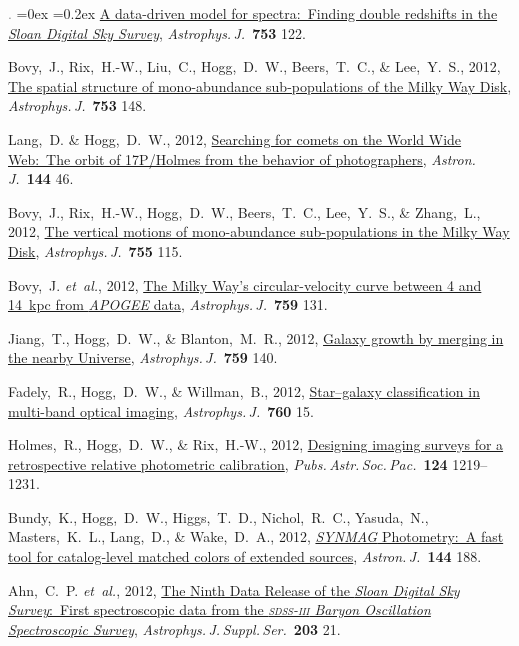 \documentclass[12pt,letterpaper]{article}
\newcommand{\latin}[1]{\textsl{#1}}
\newcommand{\etal}{\latin{et~al.}}
\newcommand{\project}[1]{\textsl{#1}}
\newcommand{\doi}[2]{\href{http://dx.doi.org/#1}{{#2}}}
\newcommand{\deemph}[1]{\textcolor{grey}{\footnotesize{#1}}}
\newcommand{\pubnumber}[1]{\deemph{{#1}.}}
\newcounter{refpubnum}
\newcommand{\hogglist}{%
    \rightmargin=0in
    \leftmargin=0.18in
    \topsep=0ex
    \partopsep=0pt
    \itemsep=0.2ex
    \parsep=0pt
    \itemindent=-1.0\leftmargin
    \listparindent=0.0\leftmargin
    \settowidth{\labelsep}{~}
    \usecounter{refpubnum}
  }
\begin{document}
\begin{list}{\pubnumber{\therefpubnum}}{\hogglist}
\doi{10.1088/0004-637X/753/2/122}{A data-driven model for spectra:\ Finding double redshifts in the \project{Sloan Digital Sky Survey}},
\textit{Astrophys.\,J.}\ \textbf{753} 122.
\item
Bovy,~J., Rix,~H.-W., Liu,~C., Hogg,~D.~W., Beers,~T.~C., \& Lee,~Y.~S., 2012,
\doi{10.1088/0004-637X/753/2/148}{The spatial structure of mono-abundance sub-populations of the Milky Way Disk},
\textit{Astrophys.\,J.}\ \textbf{753} 148.
\item
Lang,~D. \& Hogg,~D.~W., 2012,
\doi{10.1088/0004-6256/144/2/46}{Searching for comets on the World Wide Web:\ The orbit of 17P/Holmes from the behavior of photographers},
\textit{Astron.\,J.}\ \textbf{144} 46.
\item
Bovy,~J., Rix,~H.-W., Hogg,~D.~W., Beers,~T.~C., Lee,~Y.~S., \& Zhang,~L., 2012,
\doi{10.1088/0004-637X/755/2/115}{The vertical motions of mono-abundance sub-populations in the Milky Way Disk},
\textit{Astrophys.\,J.}\ \textbf{755} 115.
\item
Bovy,~J. \etal, 2012,
\doi{10.1088/0004-637X/759/2/131}{The Milky Way's circular-velocity curve between 4 and 14~kpc from \project{APOGEE} data},
\textit{Astrophys.\,J.}\ \textbf{759} 131.
\item
Jiang,~T., Hogg,~D.~W., \& Blanton,~M.~R., 2012,
\doi{10.1088/0004-637X/759/2/140}{Galaxy growth by merging in the nearby Universe},
\textit{Astrophys.\,J.}\ \textbf{759} 140.
\item
Fadely,~R., Hogg,~D.~W., \& Willman,~B., 2012,
\doi{10.1088/0004-637X/760/1/15}{Star--galaxy classification in multi-band optical imaging},
\textit{Astrophys.\,J.}\ \textbf{760} 15.
\item
Holmes,~R., Hogg,~D.~W., \& Rix,~H.-W., 2012,
\doi{10.1086/668656}{Designing imaging surveys for a retrospective relative photometric calibration},
\textit{Pubs.\,Astr.\,Soc.\,Pac.}\ \textbf{124} 1219--1231.
\item
Bundy,~K., Hogg,~D.~W., Higgs,~T.~D., Nichol,~R.~C., Yasuda,~N., Masters,~K.~L., Lang,~D.,
\& Wake,~D.~A., 2012,
\doi{10.1088/0004-6256/144/6/188}{\project{SYNMAG} Photometry:\ A fast tool for catalog-level matched colors of extended sources},
\textit{Astron.\,J.}\ \textbf{144} 188.
\item
Ahn,~C.~P. \etal, 2012,
\doi{10.1088/0067-0049/203/2/21}{The Ninth Data Release of the \project{Sloan Digital Sky Survey}:\ First spectroscopic data from the \project{\textsc{sdss-iii} Baryon Oscillation Spectroscopic Survey}},
\textit{Astrophys.\,J.\,Suppl.\,Ser.}\ \textbf{203} 21.
\item

\end{list}
\end{document}
